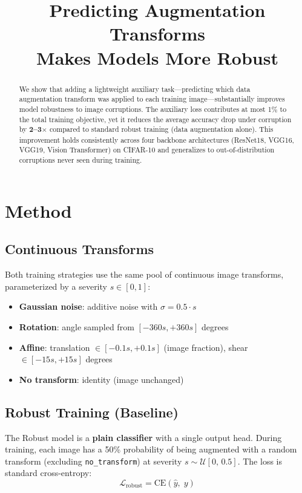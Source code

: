 \documentclass[11pt,a4paper]{article}
\title{\textbf{Predicting Augmentation Transforms\\Makes Models More Robust}}
\author{}
\date{}
\begin{document}
\maketitle

\begin{abstract}
We show that adding a lightweight auxiliary task---predicting which data augmentation transform was applied to each training image---substantially improves model robustness to image corruptions. The auxiliary loss contributes at most 1\% to the total training objective, yet it reduces the average accuracy drop under corruption by \textbf{2--3$\times$} compared to standard robust training (data augmentation alone). This improvement holds consistently across four backbone architectures (ResNet18, VGG16, VGG19, Vision Transformer) on CIFAR-10 and generalizes to out-of-distribution corruptions never seen during training.
\end{abstract}

\section{Method}

\subsection{Continuous Transforms}

Both training strategies use the same pool of continuous image transforms, parameterized by a severity $s \in [0, 1]$:

\begin{itemize}
    \item \textbf{Gaussian noise}: additive noise with $\sigma = 0.5 \cdot s$
    \item \textbf{Rotation}: angle sampled from $[-360s, +360s]$ degrees
    \item \textbf{Affine}: translation $\in [-0.1s, +0.1s]$ (image fraction), shear $\in [-15s, +15s]$ degrees
    \item \textbf{No transform}: identity (image unchanged)
\end{itemize}

\subsection{Robust Training (Baseline)}

The Robust model is a \textbf{plain classifier} with a single output head. During training, each image has a 50\% probability of being augmented with a random transform (excluding \texttt{no\_transform}) at severity $s \sim \mathcal{U}[0,\, 0.5]$. The loss is standard cross-entropy:
\begin{equation}
    \mathcal{L}_{\text{robust}} = \text{CE}(\hat{y},\; y)
\end{equation}
\end{document}
